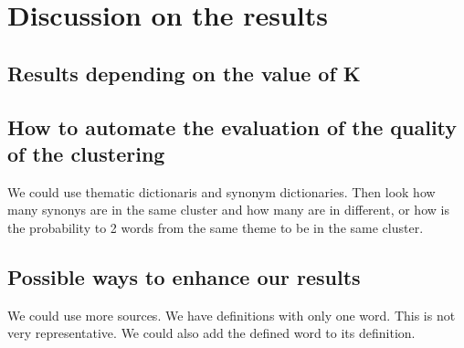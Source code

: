 \documentclass{eplDoc}
\begin{document}
\section{Discussion on the results}

\subsection{Results depending on the value of K}

\subsection{How to automate the evaluation of the quality of the clustering} %
We could use thematic dictionaris and synonym dictionaries.  Then look how many synonys are in the same cluster and how many are in different, or how is the probability to 2 words from the same theme to be in the same cluster.

\subsection{Possible ways to enhance our results} %
We could use more sources.  We have definitions with only one word.  This is not very representative.  We could also add the defined word to its definition.
\end{document}
